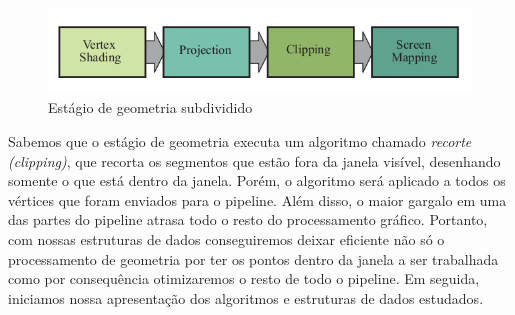 \begin{figure}[h!]
    \centering
    \includegraphics[scale=0.5]{images/Captura de tela de 2021-04-16 19-49-28.png}
    \caption{Estágio de geometria subdividido}
    \label{fig:geometry_pipeline}
\end{figure}

Sabemos que o estágio de geometria executa um algoritmo chamado \emph{recorte (clipping)}, que recorta os segmentos que estão fora da janela visível, desenhando somente o que está dentro da janela. Porém, o algoritmo será aplicado a todos os vértices que foram enviados para o pipeline. Além disso, o maior gargalo em uma das partes do pipeline atrasa todo o resto do processamento gráfico. Portanto, com nossas estruturas de dados conseguiremos deixar eficiente não só o processamento de geometria por ter os pontos dentro da janela a ser trabalhada como por consequência otimizaremos o resto de todo o pipeline. Em seguida, iniciamos nossa apresentação dos algoritmos e estruturas de dados estudados. 